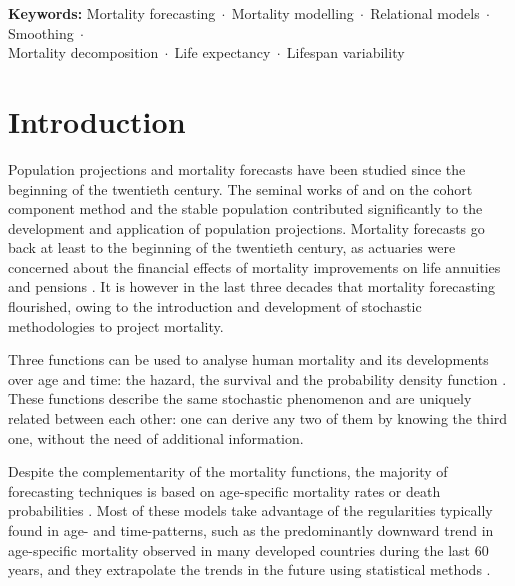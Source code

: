 \documentclass[Thesis]{subfiles}
\begin{document}
{{\vspace{0.5cm}	
\noindent \textbf{Keywords:} Mortality forecasting$\;\cdot\;$Mortality modelling$\;\cdot\;$Relational models$\;\cdot\;$Smoothing$\;\cdot\;$\\Mortality decomposition$\;\cdot\;$Life expectancy$\;\cdot\;$Lifespan variability}	
} 

\newpage


\normalsize


\section{Introduction}\label{Sec:Ch4sec1}

Population projections and mortality forecasts have been studied since the beginning of the twentieth century. The seminal works of \cite{whelpton1928population,whelpton1936empirical} and \cite{lotka1939theorie} on the cohort component method and the stable population contributed significantly to the development and application of population projections. Mortality forecasts go back at least to the beginning of the twentieth century, as actuaries were concerned about the financial effects of mortality improvements on life annuities and pensions \citep{pollard1987projection}. It is however in the last three decades that mortality forecasting flourished, owing to the introduction and development of stochastic methodologies to project mortality. 

Three functions can be used to analyse human mortality and its developments over age and time: the hazard, the survival and the probability density function \citep{klein2003survival}. These functions describe the same stochastic phenomenon and are uniquely related between each other: one can derive any two of them by knowing the third one, without the need of additional information. 

Despite the complementarity of the mortality functions, the majority of forecasting techniques is based on age-specific mortality rates or death probabilities \citep[for comprehensive reviews, see][]{booth2008mortality,cairns2009quantitative,shang2011point,stoeldraijer2013impact}. Most of these models take advantage of the regularities typically found in age- and time-patterns, such as the predominantly downward trend in age-specific mortality observed in many developed countries during the last 60 years, and they extrapolate the trends in the future using statistical methods \citep{haberman2011comparative}. 
\end{document}
